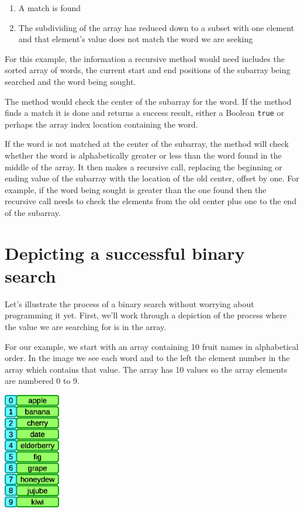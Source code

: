 \begin{enumerate}
	\item A match is found
	\item The subdividing of the array has reduced down to a subset with one element and that element's value does not match the word we are seeking
\end{enumerate}

For this example, the information a recursive method would need includes the sorted array of words, the current start and end positions of the subarray being searched and the word being sought.

The method would check the center of the subarray for the word. If the method finds a match it is done and returns a success result, either a Boolean \texttt{true} or perhaps the array index location containing the word. 

If the word is not matched at the center of the subarray, the method will check whether the word is alphabetically greater or less than the word found in the middle of the array. It then makes a recursive call, replacing the beginning or ending value of the subarray with the location of the old center, offset by one. For example, if the word being sought is greater than the one found then the recursive call needs to check the elements from the old center plus one to the end of the subarray.

\section{Depicting a successful binary search}

Let's illustrate the process of a binary search without worrying about programming it yet. First, we'll work through a depiction of the process where the value we are searching for is in the array. 

For our example, we start with an array containing 10 fruit names in alphabetical order. In the image we see each word and to the left the element number in the array which contains that value. The array has 10 values so the array elements are numbered 0 to 9.

\beforefig
\centerline{\includegraphics[height=2in]{figs2/recursion-binsearch-initiallist.eps}}
\afterfig

